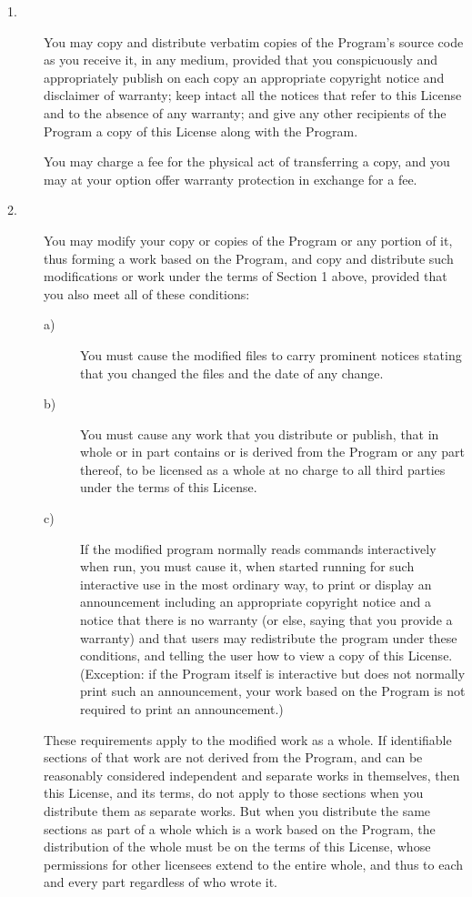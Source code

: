 {\begin{description}
\item[1.\hphantom{XX}] You may copy and distribute verbatim copies of the Program's
source code as you receive it, in any medium, provided that you
conspicuously and appropriately publish on each copy an appropriate
copyright notice and disclaimer of warranty; keep intact all the
notices that refer to this License and to the absence of any warranty;
and give any other recipients of the Program a copy of this License
along with the Program.

You may charge a fee for the physical act of transferring a copy, and
you may at your option offer warranty protection in exchange for a fee.

\item[2.\hphantom{XX}] You may modify your copy or copies of the Program or any portion
of it, thus forming a work based on the Program, and copy and
distribute such modifications or work under the terms of Section 1
above, provided that you also meet all of these conditions:

\begin{description}
\item[a)\ ] You must cause the modified files to carry prominent notices
    stating that you changed the files and the date of any change.

\item[b)\ ] You must cause any work that you distribute or publish, that in
    whole or in part contains or is derived from the Program or any
    part thereof, to be licensed as a whole at no charge to all third
    parties under the terms of this License.

\item[c)\ ] If the modified program normally reads commands interactively
    when run, you must cause it, when started running for such
    interactive use in the most ordinary way, to print or display an
    announcement including an appropriate copyright notice and a
    notice that there is no warranty (or else, saying that you provide
    a warranty) and that users may redistribute the program under
    these conditions, and telling the user how to view a copy of this
    License.  (Exception: if the Program itself is interactive but
    does not normally print such an announcement, your work based on
    the Program is not required to print an announcement.)
\end{description}

These requirements apply to the modified work as a whole.  If
identifiable sections of that work are not derived from the Program, and
can be reasonably considered independent and separate works in
themselves, then this License, and its terms, do not apply to those
sections when you distribute them as separate works.  But when you
distribute the same sections as part of a whole which is a work based on
the Program, the distribution of the whole must be on the terms of this
License, whose permissions for other licensees extend to the entire
whole, and thus to each and every part regardless of who wrote it.


\end{description}}
